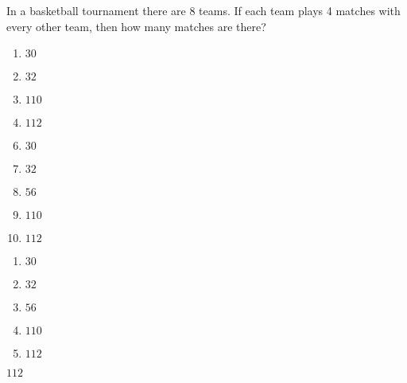 




 In a basketball tournament there are 8 teams.  If each team plays 4 matches with every other team, then how many matches are there?


\ifsat
	\begin{enumerate}[label=\Alph*)]
		\item    $30$
		\item  $32$ 
		\item $110$ 
		\item  $112$ %
	\end{enumerate}
\else
\fi

\ifacteven
	\begin{enumerate}[label=\textbf{\Alph*.},itemsep=\fill,align=left]
		\setcounter{enumii}{5}
		\item    $30$
		\item  $32$ 
		\item $56$ 
		\addtocounter{enumii}{1}
		\item $110$ 
		\item  $112$ %
	\end{enumerate}
\else
\fi

\ifactodd
	\begin{enumerate}[label=\textbf{\Alph*.},itemsep=\fill,align=left]
		\item    $30$
		\item  $32$ 
		\item $56$ 
		\item $110$ 
		\item  $112$ %
	\end{enumerate}
\else
\fi

\ifgridin
  $112$ %

\else
\fi

